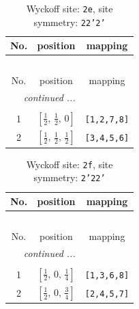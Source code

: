 \documentclass[fleqn,8pt]{jsarticle}
\begin{document}
\begin{longtable}{ccc}
\caption{Wyckoff site: {\tt 2e}, site symmetry: {\tt 22'2'}}
 \\
 \hline \hline
No. & position & mapping \\ \hline \endfirsthead

\multicolumn{2}{l}{\tablename\ \thetable{}} \\
 \hline \hline
No. & position & mapping \\ \hline \endhead

 \hline \hline
\multicolumn{2}{r}{\footnotesize\it continued ...} \\ \endfoot

 \hline \hline
\multicolumn{2}{r}{} \\ \endlastfoot

1 & $\left[ \frac{1}{2},\, \frac{1}{2},\, 0 \right]$ & {\tt [1,2,7,8]} \\ \hline
2 & $\left[ \frac{1}{2},\, \frac{1}{2},\, \frac{1}{2} \right]$ & {\tt [3,4,5,6]} \\
\end{longtable}
\renewcommand{\arraystretch}{1.2}
\begin{longtable}{ccc}
\caption{Wyckoff site: {\tt 2f}, site symmetry: {\tt 2'22'}}
 \\
 \hline \hline
No. & position & mapping \\ \hline \endfirsthead

\multicolumn{2}{l}{\tablename\ \thetable{}} \\
 \hline \hline
No. & position & mapping \\ \hline \endhead

 \hline \hline
\multicolumn{2}{r}{\footnotesize\it continued ...} \\ \endfoot

 \hline \hline
\multicolumn{2}{r}{} \\ \endlastfoot

1 & $\left[ \frac{1}{2},\, 0,\, \frac{1}{4} \right]$ & {\tt [1,3,6,8]} \\ \hline
2 & $\left[ \frac{1}{2},\, 0,\, \frac{3}{4} \right]$ & {\tt [2,4,5,7]} \\
\end{longtable}
\renewcommand{\arraystretch}{1.2}
\end{document}

